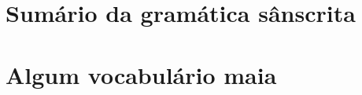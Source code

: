 \documentclass[a4paper]{ifacconf}
\begin{document}







\appendix
\section{Sumário da gramática sânscrita}    %
\section{Algum vocabulário maia}              %
\end{document}
